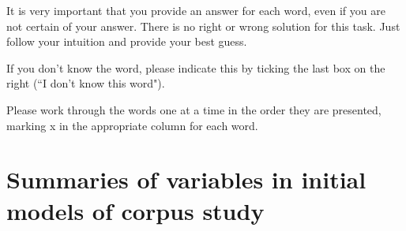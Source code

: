 It is very important that you provide an answer for each word, even if you are not certain of your answer. There is no right or wrong solution for this task. Just follow your intuition and provide your best guess.

If you don’t know the word, please indicate this by ticking the last box on the right (``I don't know this word").

Please work through the words one at a time in the order they are presented, marking x in the appropriate column for each word.



\chapter{Summaries of variables in initial models of corpus study}\label{App B: Summaries of variables in initial models of corpus study}

